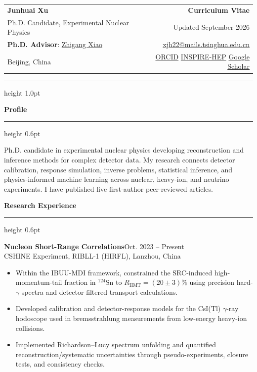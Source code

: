 \documentclass[10pt]{article}
\newcommand{\cvsection}[1]{%
  \vspace{0.75em}
  {\large\bfseries\color{accent} #1}\par
  \vspace{0.2em}
  {\color{rule}\hrule height 0.6pt}
  \vspace{0.45em}
}
\newcommand{\entry}[3]{%
  \textbf{#1}\hfill{\color{muted}#2}\\
  {\color{muted}#3}\par
}
\begin{document}
\pagestyle{empty}
\color{ink}

\begin{tabularx}{\linewidth}{@{}Xr@{}}
  {\LARGE\bfseries Junhuai Xu} &
  {\large\bfseries\color{accent}Curriculum Vitae} \\
  Ph.D. Candidate, Experimental Nuclear Physics &
  {\small\color{muted}Updated September 2026} \\
  \textbf{Ph.D. Advisor}: \href{https://inspirehep.net/authors/1062622}{Zhigang Xiao} &
  \href{mailto:xjh22@mails.tsinghua.edu.cn}{xjh22@mails.tsinghua.edu.cn} \\
  Beijing, China &
  \href{https://orcid.org/0000-0001-7529-8786}{ORCID} \quad
  \href{https://inspirehep.net/authors/1866896}{INSPIRE-HEP} \quad
  \href{https://scholar.google.com/citations?user=XK-LVeIAAAAJ\&hl=en}{Google Scholar}
\end{tabularx}

\vspace{0.55em}
{\color{accent}\hrule height 1.0pt}

\cvsection{Profile}
Ph.D. candidate in experimental nuclear physics developing
reconstruction and inference methods for complex detector data. My research
connects detector calibration, response simulation, inverse problems,
statistical inference, and physics-informed machine learning across nuclear,
heavy-ion, and neutrino experiments. I have published five first-author
peer-reviewed articles.

\cvsection{Research Experience}
\entry{Nucleon Short-Range Correlations}{Oct. 2023 -- Present}{CSHINE Experiment, RIBLL-1 (HIRFL), Lanzhou, China}
\begin{itemize}[leftmargin=1.25em,itemsep=1pt,topsep=2pt]
  \item Within the IBUU-MDI framework, constrained the SRC-induced
    high-momentum-tail fraction in ${}^{124}$Sn to
    \(R_{\mathrm{HMT}}=(20\pm3)\%\) using precision hard-$\gamma$ spectra and
    detector-filtered transport calculations.
  \item Developed calibration and detector-response models for the CsI(Tl) $\gamma$-ray hodoscope used in bremsstrahlung measurements from low-energy heavy-ion collisions.
  \item Implemented Richardson--Lucy spectrum unfolding and quantified reconstruction/systematic uncertainties through pseudo-experiments, closure tests, and consistency checks.
\end{itemize}
\end{document}
